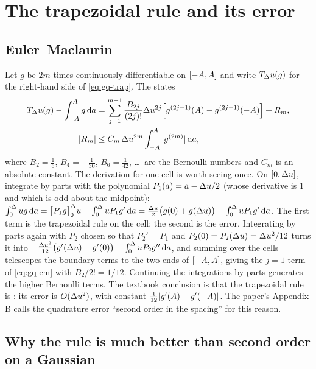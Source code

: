 \section{The trapezoidal rule and its error}

\subsection{Euler--Maclaurin}

Let $g$ be $2m$ times continuously differentiable on $[-A,A]$ and
write $T_\Delta u(g)$ for the right-hand side of \cref{eq:gq-trap}. The
 states
\begin{equation}
\begin{aligned}
  T_\Delta u(g)-\int_{-A}^{A}g\,\mathrm{d} a
  &=\sum_{j=1}^{m-1}\frac{B_{2j}}{(2j)!}\Delta u^{2j}\Bigl[g^{(2j-1)}(A)-g^{(2j-1)}(-A)\Bigr]+R_m,\\
  |R_m|&\le C_m\,\Delta u^{2m}\int_{-A}^{A}|g^{(2m)}|\,\mathrm{d} a,
\end{aligned}
  \label{eq:gq-em}
\end{equation}
where $B_2=\tfrac16$, $B_4=-\tfrac1{30}$, $B_6=\tfrac1{42}$, \dots\ are the Bernoulli
numbers and $C_m$ is an absolute constant. The derivation for one cell is worth
seeing once. On $[0,\Delta u]$, integrate by parts with the polynomial
$P_1(a)=a-\Delta u/2$ (whose derivative is $1$ and which is odd about the midpoint):
$\int_0^\Delta u g\,\mathrm{d} a=\bigl[P_1 g\bigr]_0^\Delta u-\int_0^\Delta u P_1g'\,\mathrm{d} a
=\tfrac{\Delta u}2\bigl(g(0)+g(\Delta u)\bigr)-\int_0^\Delta u P_1g'\,\mathrm{d} a$. The first term is the
trapezoidal rule on the cell; the second is the error. Integrating by parts again with
$P_2$ chosen so that $P_2'=P_1$ and $P_2(0)=P_2(\Delta u)=\Delta u^2/12$ turns it into
$-\tfrac{\Delta u^2}{12}\bigl(g'(\Delta u)-g'(0)\bigr)+\int_0^\Delta u P_2g''\,\mathrm{d} a$, and
summing over the cells telescopes the boundary terms to the two ends of
$[-A,A]$, giving the $j=1$ term of \cref{eq:gq-em} with
$B_2/2!=1/12$. Continuing the integrations by parts generates the higher Bernoulli
terms. The textbook conclusion is that the trapezoidal rule is :
its error is $O(\Delta u^2)$, with constant $\tfrac1{12}|g'(A)-g'(-A)|$.
The paper's Appendix B calls the quadrature error ``second order in the spacing'' for
this reason.

\subsection{Why the rule is much better than second order on a Gaussian}

